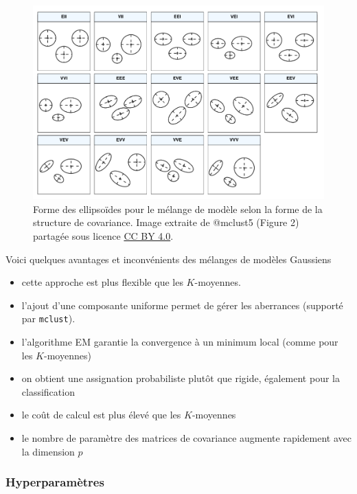 \documentclass[
  11pt,
  letterpaper,
]{book}
\providecommand{\tightlist}{%
  \setlength{\itemsep}{0pt}\setlength{\parskip}{0pt}}\usepackage{longtable,booktabs,array}
\theoremstyle{definition}
\theoremstyle{remark}
\begin{document}
\begin{figure}[ht!]

{\centering \includegraphics[width=1\textwidth,height=\textheight]{./figures/mclust5-parametrization.png}

}

\caption{\label{fig-modeles}Forme des ellipsoïdes pour le mélange de
modèle selon la forme de la structure de covariance. Image extraite de
@mclust5 (Figure 2) partagée sous licence
\href{https://creativecommons.org/licenses/by/4.0/}{CC BY 4.0}.}

\end{figure}

Voici quelques avantages et inconvénients des mélanges de modèles
Gaussiens

\begin{itemize}
\tightlist
\item
  cette approche est plus flexible que les \(K\)-moyennes.
\item
  l'ajout d'une composante uniforme permet de gérer les aberrances
  (supporté par \texttt{mclust}).
\item
  l'algorithme EM garantie la convergence à un minimum local (comme pour
  les \(K\)-moyennes)
\item
  on obtient une assignation probabiliste plutôt que rigide, également
  pour la classification
\item
  le coût de calcul est plus élevé que les \(K\)-moyennes
\item
  le nombre de paramètre des matrices de covariance augmente rapidement
  avec la dimension \(p\)
\end{itemize}

\hypertarget{hyperparamuxe8tres}{%
\subsubsection{Hyperparamètres}\label{hyperparamuxe8tres}}
\end{document}

